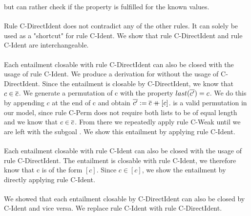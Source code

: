 but can rather check if the property is fulfilled
for the known values.\\
\\
Rule C-DirectIdent does not contradict any of the other rules.
It can solely be used as a "shortcut" for rule C-Ident.
We show that rule C-DirectIdent and rule C-Ident are interchangeable.\\
\\
Each entailment  closable with rule C-DirectIdent
can also be closed with the usage of rule C-Ident.
We produce a derivation for 
without the usage of C-DirectIdent.
Since the entailment is closable by C-DirectIdent,
we know that $c \in \overline{c}$.
We generate a permutation  of \ovl c
with the property $last(\overline{c'}) = c$.
We do this by appending $c$ at the end of \ovl c
and obtain $\overline{c'} := \overline{c} \mathbin{+\mkern-10mu+} [c]$.
 is a valid permutation in our model,
since rule C-Perm does not require
both lists to be of equal length and
we know that $c \in \overline{c}$.
From there we repeatedly apply rule C-Weak
until we are left with the subgoal .
We show this entailment by applying rule C-Ident.\\
\\
Each entailment  closable with rule C-Ident
can also be closed with the usage of rule C-DirectIdent.
The entailment is closable with rule C-Ident,
we therefore know that \ovl c is of the form $[c]$.
Since $c \in [c]$, we show the entailment 
by directly applying rule C-Ident.\\
\\
We showed that each entailment closable by C-DirectIdent
can also be closed by C-Ident and vice versa.
We replace rule C-Ident with rule C-DirectIdent.


